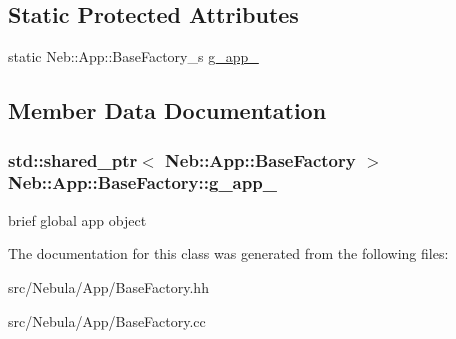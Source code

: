 \subsection*{\-Static \-Protected \-Attributes}
\begin{DoxyCompactItemize}
\item 
static \-Neb\-::\-App\-::\-Base\-Factory\-\_\-s \hyperlink{classNeb_1_1App_1_1BaseFactory_a2add590edaa414b5346b67af7ce9d344}{g\-\_\-app\-\_\-}
\end{DoxyCompactItemize}


\subsection{\-Member \-Data \-Documentation}
\hypertarget{classNeb_1_1App_1_1BaseFactory_a2add590edaa414b5346b67af7ce9d344}{
\subsubsection[{g\-\_\-app\-\_\-}]{\setlength{\rightskip}{0pt plus 5cm}std\-::shared\-\_\-ptr$<$ {\bf \-Neb\-::\-App\-::\-Base\-Factory} $>$ {\bf \-Neb\-::\-App\-::\-Base\-Factory\-::g\-\_\-app\-\_\-}}}\label{classNeb_1_1App_1_1BaseFactory_a2add590edaa414b5346b67af7ce9d344}
brief global app object 

\-The documentation for this class was generated from the following files\-:\begin{DoxyCompactItemize}
\item 
src/\-Nebula/\-App/\-Base\-Factory.\-hh\item 
src/\-Nebula/\-App/\-Base\-Factory.\-cc\end{DoxyCompactItemize}
